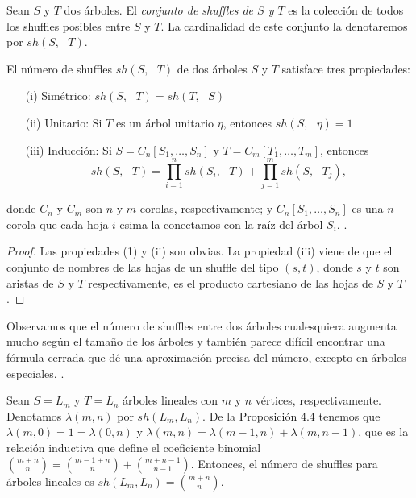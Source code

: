 \documentclass[../main.tex]{subfiles}
\begin{document}
\begin{defi}
    Sean $S$ y $T$ dos \'arboles. El \emph{conjunto de shuffles de $S$ y $T$} es la colecci\'on de todos los shuffles posibles entre $S$ y $T$. La cardinalidad de este conjunto la denotaremos por $sh(S,\text{ }T)$.
\end{defi}
\begin{prop}
    El n\'umero de shuffles $sh(S,\text{ }T)$ de dos \'arboles $S$ y $T$ satisface tres propiedades:
    \begin{enumerate}
        \item[{\rm (i)}] Sim\'etrico: $sh(S, \text{ }T) = sh(T, \text{ }S)$
        \item[{\rm (ii)}] Unitario: Si $T$ es un \'arbol unitario $\eta$, entonces $sh(S, \text{ }\eta)=1$
        \item[{\rm (iii)}] Inducci\'on: Si $S=C_n[S_1,\dots,S_n]$ y $T=C_m[T_1,\dots,T_m]$, entonces
              $$
                  sh(S, \text{ }T)  = \prod_{i=1}^n sh(S_i, \text{ }T) + \prod_{j=1}^m sh(S, \text{ }T_j),
              $$
    \end{enumerate}
    donde $C_n$ y $C_m$ son $n$ y $m$-corolas, respectivamente; y $C_n[S_1,\dots,S_n]$ es una $n$-corola que cada hoja $i$-esima la conectamos con la ra\'iz del \'arbol $S_i$. \cite[Proposici\'on 3.1]{SoT}.
\end{prop}
\begin{proof}
    Las propiedades (1) y (ii) son obvias. La propiedad (iii) viene de que el conjunto de nombres de las hojas de un shuffle del tipo $(s, t)$, donde $s$ y $t$ son aristas de $S$ y $T$ respectivamente, es el producto cartesiano de las hojas de $S$ y $T$.
\end{proof}

Observamos que el n\'umero de shuffles entre dos \'arboles cualesquiera augmenta mucho seg\'un el tama\~no de los \'arboles y tambi\'en parece dif\'icil encontrar una f\'ormula cerrada que d\'e una aproximaci\'on precisa del n\'umero, excepto en \'arboles especiales. \cite[Observaci\'on 3.2]{SoT}.

Sean $S=L_m$ y $T=L_n$ \'arboles lineales con $m$ y $n$ v\'ertices, respectivamente. Denotamos $\lambda(m,n)$ por $sh(L_m, L_n)$. De la Proposici\'on 4.4 tenemos que $\lambda(m,0) = 1 = \lambda(0,n)$ y $\lambda(m,n) = \lambda(m-1,n) + \lambda(m,n-1)$, que es la relaci\'on inductiva que define el coeficiente binomial $\binom{m+n}{n} = \binom{m-1+n}{n} + \binom{m+n-1}{n-1}$. Entonces, el n\'umero de shuffles para \'arboles lineales es $sh(L_m, L_n) = \binom{m+n}{n}$.
\end{document}
